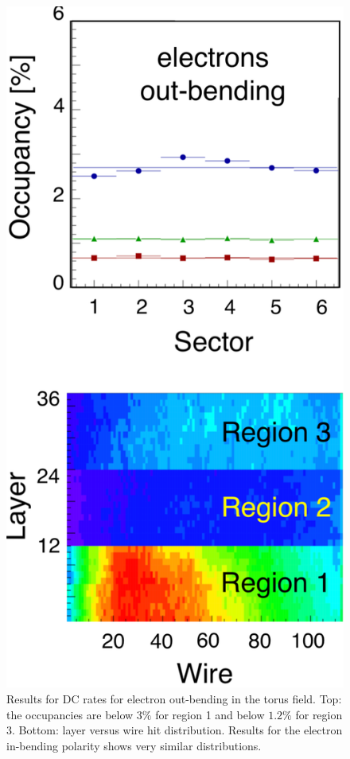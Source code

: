 \begin{figure}
	\centering
	\includegraphics[width=0.99\columnwidth,keepaspectratio]{img/dcOccupancy.png}
	\caption{Results for DC rates for electron out-bending in the torus field.
		     Top: the occupancies are below $3\%$ for region 1 and below $1.2\%$ for region 3. Bottom: layer
		     versus wire hit distribution. Results for the electron in-bending polarity shows very similar distributions.}
	\label{fig:dcOccupancy}
\end{figure}

